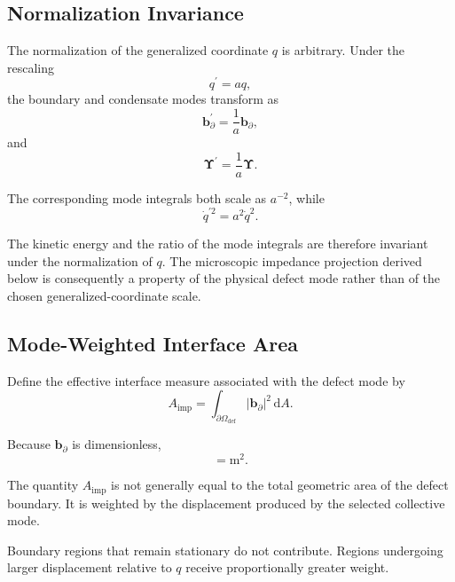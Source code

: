 \subsection{Normalization Invariance}

The normalization of the generalized coordinate $q$ is arbitrary. Under the rescaling
\begin{equation}
    q^{\prime} = aq,
\end{equation}
the boundary and condensate modes transform as
\begin{equation}
    \mathbf{b}_{\partial}^{\prime} = \frac{1}{a}\mathbf{b}_{\partial},
\end{equation}
and
\begin{equation}
    \boldsymbol{\Upsilon}^{\prime} = \frac{1}{a}\boldsymbol{\Upsilon}.
\end{equation}

The corresponding mode integrals both scale as $a^{-2}$, while
\begin{equation}
    \dot{q}^{\prime 2} = a^2\dot{q}^2.
\end{equation}

The kinetic energy and the ratio of the mode integrals are therefore invariant under the normalization of $q$. The microscopic impedance projection derived below is consequently a property of the physical defect mode rather than of the chosen generalized-coordinate scale.

\subsection{Mode-Weighted Interface Area}

Define the effective interface measure associated with the defect mode by
\begin{equation}
    \boxed{ A_{\mathrm{imp}} = \int_{\partial\Omega_{\mathrm{def}}} \left| \mathbf{b}_{\partial} \right|^2 \, \mathrm{d}A }.
\end{equation}

Because $\mathbf{b}_{\partial}$ is dimensionless,
\begin{equation}
    [A_{\mathrm{imp}}] = \mathrm{m}^2.
\end{equation}

The quantity $A_{\mathrm{imp}}$ is not generally equal to the total geometric area of the defect boundary. It is weighted by the displacement produced by the selected collective mode.

Boundary regions that remain stationary do not contribute. Regions undergoing larger displacement relative to $q$ receive proportionally greater weight.


